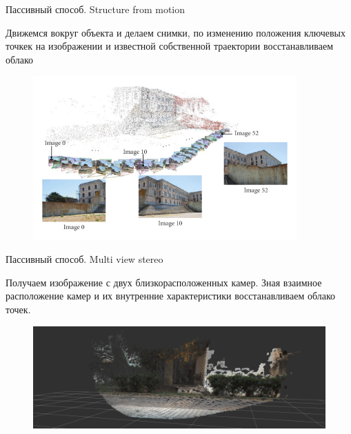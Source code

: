 \documentclass[6pt,pdf,utf8,russian]{beamer}
\begin{document}
\begin{frame}[fragile]{Пассивный способ. Structure from motion}
    \begin{block}{}
        Движемся вокруг объекта и делаем снимки, по
        изменению положения ключевых точкек на изображении и известной собственной
        траектории восстанавливаем облако
    \end{block}

    \pause

    \begin{figure}
        \includegraphics[width=0.9\textwidth]{images/structure_from_motion.jpg}
    \end{figure}

\end{frame}

\begin{frame}[fragile]{Пассивный способ. Multi view stereo}
    \begin{block}{}
        Получаем изображение с двух близкорасположенных камер. Зная взаимное расположение камер
        и их внутренние характеристики восстанавливаем облако точек.
    \end{block}

    \pause

    \begin{figure}
        \includegraphics[width=\textwidth]{images/multi_view_stereo.png}
    \end{figure}

\end{frame}
\end{document}
